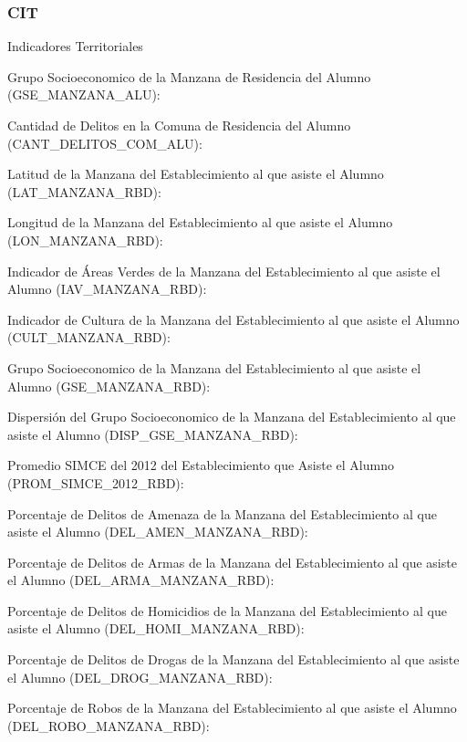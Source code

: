 \subsubsection{CIT}
\begin{longdescription}
  \item[Indicadores Territoriales] \hfill \\
    \begin{longdescription}
        \item[Grupo Socioeconomico de la Manzana de Residencia del Alumno] (GSE\_MANZANA\_ALU):
        \item[Cantidad de Delitos en la Comuna de Residencia del Alumno](CANT\_DELITOS\_COM\_ALU):
        \item[Latitud de la Manzana del Establecimiento al que asiste el Alumno](LAT\_MANZANA\_RBD):
        \item[Longitud de la Manzana del Establecimiento al que asiste el Alumno](LON\_MANZANA\_RBD):
        \item[Indicador de Áreas Verdes de la Manzana del Establecimiento al que asiste el Alumno](IAV\_MANZANA\_RBD):
        \item[Indicador de Cultura de la Manzana del Establecimiento al que asiste el Alumno ](CULT\_MANZANA\_RBD):
        \item[Grupo Socioeconomico de la Manzana del Establecimiento al que asiste el Alumno](GSE\_MANZANA\_RBD):
        \item[Dispersión del Grupo Socioeconomico de la Manzana del Establecimiento al que asiste el Alumno](DISP\_GSE\_MANZANA\_RBD):
        \item[Promedio SIMCE del 2012 del Establecimiento que Asiste el Alumno](PROM\_SIMCE\_2012\_RBD):
        \item[Porcentaje de Delitos de Amenaza de la Manzana del Establecimiento al que asiste el Alumno](DEL\_AMEN\_MANZANA\_RBD):
        \item[Porcentaje de Delitos de Armas de la Manzana del Establecimiento al que asiste el Alumno](DEL\_ARMA\_MANZANA\_RBD):
        \item[Porcentaje de Delitos de Homicidios de la Manzana del Establecimiento al que asiste el Alumno](DEL\_HOMI\_MANZANA\_RBD):
        \item[Porcentaje de Delitos de Drogas de la Manzana del Establecimiento al que asiste el Alumno](DEL\_DROG\_MANZANA\_RBD):
        \item[Porcentaje de Robos de la Manzana del Establecimiento al que asiste el Alumno](DEL\_ROBO\_MANZANA\_RBD):

\end{longdescription}
\end{longdescription}
